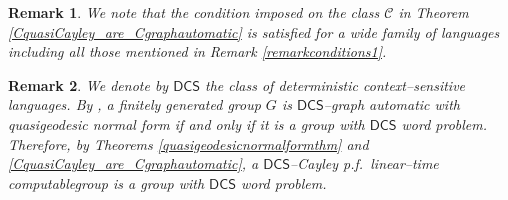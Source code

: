 \documentclass[article,12pt]{elsarticle}
\newtheorem{remark}{Remark}
\newcommand\linearC{Cayley p.f.~linear--time computable}
\begin{document}
\begin{remark}
	We note that the condition imposed on the class $\mathcal{C}$ in Theorem \ref{CquasiCayley_are_Cgraphautomatic} 
	is satisfied for a wide family of languages 
	including all those mentioned in Remark 
	\ref{remarkconditions1}.   
\end{remark}
\begin{remark} 
	
	We denote by $\mathsf{DCS}$ the class of 
	deterministic context--sensitive languages. 
	By \cite[Theorem~15]{ElderTabackCgraph}, a finitely generated group $G$ is $\mathsf{DCS}$--graph automatic 
	with quasigeodesic normal form if and only if it is 
	a group with $\mathsf{DCS}$ word problem. 
	Therefore, by Theorems \ref{quasigeodesicnormalformthm}
	and \ref{CquasiCayley_are_Cgraphautomatic}, 
	a $\mathsf{DCS}$--\linearC group is a 
	group with $\mathsf{DCS}$ word problem. 
\end{remark} 	 
\end{document}
